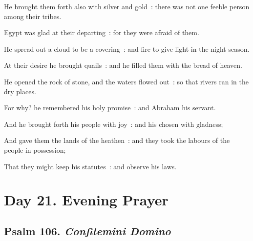 He brought them forth also with silver and gold~: there was not one feeble person among their tribes.\par
{}Egypt was glad at their departing~: for they were afraid of them.\par
{}He spread out a cloud to be a covering~: and fire to give light in the night-season.\par
{}At their desire he brought quails~: and he filled them with the bread of heaven.\par
{}He opened the rock of stone, and the waters flowed out~: so that rivers ran in the dry places.\par
{}For why? he remembered his holy promise~: and Abraham his servant.\par
{}And he brought forth his people with joy~: and his chosen with gladness;\par
{}And gave them the lands of the heathen~: and they took the labours of the people in possession;\par
{}That they might keep his statutes~: and observe his laws.\par



\clearpage
\section*{Day 21. Evening Prayer}

\subsection{Psalm 106. \textit{Confitemini Domino}}


